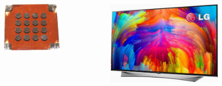\documentclass[aspectratio=169]{beamer}
\begin{document}
\begin{frame}
  \begin{columns}
    \begin{column}{0.25\textwidth}
      \begin{figure}
        \includegraphics[width=\textwidth]{figures/devices/quantum_dot_solar_cell.jpg}
      \end{figure}
    \end{column}

    \begin{column}{0.25\textwidth}
      \begin{figure}
        \includegraphics[width=\textwidth]{figures/devices/quantum_dot_tv.jpg}
      \end{figure}
    \end{column}


\end{columns}
\end{frame}
\end{document}
